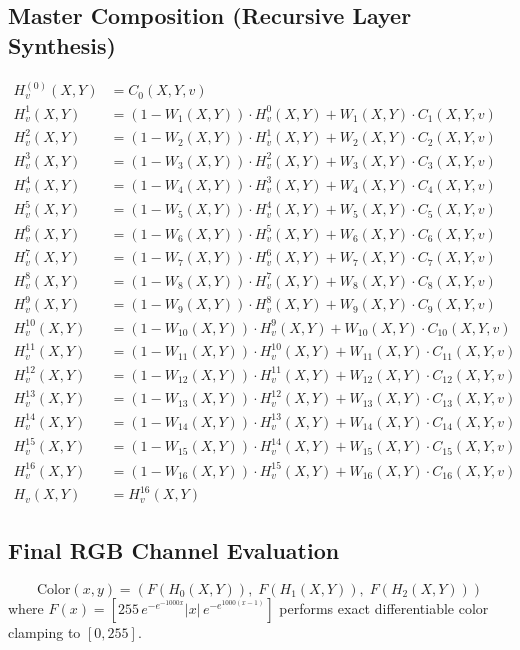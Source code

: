 \documentclass[10pt]{article}
\begin{document}
\subsection*{Master Composition (Recursive Layer Synthesis)}
\begin{align*}
  H_v^{(0)}(X,Y) &= C_0(X,Y,v) \\[4pt]
  H_v^{1}(X,Y) &= \left(1 - W_{1}(X,Y)\right)\cdot H_v^{0}(X,Y) + W_{1}(X,Y)\cdot C_{1}(X,Y,v) \\[3pt]
  H_v^{2}(X,Y) &= \left(1 - W_{2}(X,Y)\right)\cdot H_v^{1}(X,Y) + W_{2}(X,Y)\cdot C_{2}(X,Y,v) \\[3pt]
  H_v^{3}(X,Y) &= \left(1 - W_{3}(X,Y)\right)\cdot H_v^{2}(X,Y) + W_{3}(X,Y)\cdot C_{3}(X,Y,v) \\[3pt]
  H_v^{4}(X,Y) &= \left(1 - W_{4}(X,Y)\right)\cdot H_v^{3}(X,Y) + W_{4}(X,Y)\cdot C_{4}(X,Y,v) \\[3pt]
  H_v^{5}(X,Y) &= \left(1 - W_{5}(X,Y)\right)\cdot H_v^{4}(X,Y) + W_{5}(X,Y)\cdot C_{5}(X,Y,v) \\[3pt]
  H_v^{6}(X,Y) &= \left(1 - W_{6}(X,Y)\right)\cdot H_v^{5}(X,Y) + W_{6}(X,Y)\cdot C_{6}(X,Y,v) \\[3pt]
  H_v^{7}(X,Y) &= \left(1 - W_{7}(X,Y)\right)\cdot H_v^{6}(X,Y) + W_{7}(X,Y)\cdot C_{7}(X,Y,v) \\[3pt]
  H_v^{8}(X,Y) &= \left(1 - W_{8}(X,Y)\right)\cdot H_v^{7}(X,Y) + W_{8}(X,Y)\cdot C_{8}(X,Y,v) \\[3pt]
  H_v^{9}(X,Y) &= \left(1 - W_{9}(X,Y)\right)\cdot H_v^{8}(X,Y) + W_{9}(X,Y)\cdot C_{9}(X,Y,v) \\[3pt]
  H_v^{10}(X,Y) &= \left(1 - W_{10}(X,Y)\right)\cdot H_v^{9}(X,Y) + W_{10}(X,Y)\cdot C_{10}(X,Y,v) \\[3pt]
  H_v^{11}(X,Y) &= \left(1 - W_{11}(X,Y)\right)\cdot H_v^{10}(X,Y) + W_{11}(X,Y)\cdot C_{11}(X,Y,v) \\[3pt]
  H_v^{12}(X,Y) &= \left(1 - W_{12}(X,Y)\right)\cdot H_v^{11}(X,Y) + W_{12}(X,Y)\cdot C_{12}(X,Y,v) \\[3pt]
  H_v^{13}(X,Y) &= \left(1 - W_{13}(X,Y)\right)\cdot H_v^{12}(X,Y) + W_{13}(X,Y)\cdot C_{13}(X,Y,v) \\[3pt]
  H_v^{14}(X,Y) &= \left(1 - W_{14}(X,Y)\right)\cdot H_v^{13}(X,Y) + W_{14}(X,Y)\cdot C_{14}(X,Y,v) \\[3pt]
  H_v^{15}(X,Y) &= \left(1 - W_{15}(X,Y)\right)\cdot H_v^{14}(X,Y) + W_{15}(X,Y)\cdot C_{15}(X,Y,v) \\[3pt]
  H_v^{16}(X,Y) &= \left(1 - W_{16}(X,Y)\right)\cdot H_v^{15}(X,Y) + W_{16}(X,Y)\cdot C_{16}(X,Y,v) \\[3pt]
  H_v(X,Y) &= H_v^{16}(X,Y)
\end{align*}

\subsection*{Final RGB Channel Evaluation}
\[
  \text{Color}(x,y) = \left( F\left(H_0(X,Y)\right), \; F\left(H_1(X,Y)\right), \; F\left(H_2(X,Y)\right) \right)
\]
where $F(x) = \left[255\,e^{-e^{-1000x}}|x|\,e^{-e^{1000(x-1)}}\right]$ performs exact differentiable color clamping to $[0, 255]$.
\end{document}
